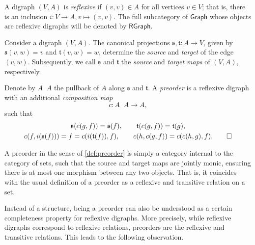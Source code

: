 \documentclass[12pt,dvipsnames,oneside]{amsart}
\theoremstyle{plain}
\theoremstyle{remark}
\theoremstyle{definition}
\newcommand*{\from}{\colon}
\newcommand{\plgraph}{\mathsf{Graph}}
\newcommand{\rgraph}{\mathsf{RGraph}}
\begin{document}
\begin{definition}\label{def:morphism-of-digraphs}
  A digraph \((V,A)\) is \emph{reflexive} if \((v,v)\in A\) for all vertices \(v\in V\);
  that is, there is an inclusion \(i\from V \to A, v \mapsto (v,v)\).
  The full subcategory of \(\plgraph\) whose objects are reflexive digraphs will be denoted by \(\rgraph\).
\end{definition}
Consider a digraph \((V,A)\).
The canonical projections \(\mathfrak{s}, \mathfrak{t} \from A \to V\), given by  \(\mathfrak{s} (v,w) = v\) and \(\mathfrak{t}(v,w) = w\), determine the \emph{source} and \emph{target} of the edge \((v,w)\).
Subsequently, we call \(\mathfrak{s}\) and \(\mathfrak{t}\) the \emph{source} and \emph{target maps} of \((V,A)\), respectively.









\begin{definition}\label{def:preorder}
  Denote by \(A \mathop{_{\mathfrak{s}}\times_{\mathfrak{t}}} A\) the pullback of \(A\) along \(\mathfrak{s}\) and \(\mathfrak{t}\).
  A \emph{preorder} is a reflexive digraph with an additional \emph{composition map}
  \[
    c \colon A \mathop{_{\mathfrak{s}}\times_{\mathfrak{t}}} A \to A,
  \]
  such that
  \begin{gather*}
    \mathfrak{s}(c(g,f)) = \mathfrak{s}(f), \qquad \mathfrak{t}(c(g,f)) = \mathfrak{t}(g), \\
    c(f,i(\mathfrak{s}(f))) = f = c(i(\mathfrak{t}(f)),f), \qquad c(h,c(g,f)) = c(c(h,g),f). \qedhere
  \end{gather*}
\end{definition}

\begin{remark}
  A preorder in the sense of \cref{def:preorder} is simply a category internal to the category of sets,
  such that the source and target maps are jointly monic, ensuring there is at most one morphism between any two objects.
  That is, it coincides with the usual definition of a preorder as a reflexive and transitive relation on a set.
\end{remark}

Instead of a structure, being a preorder can also be understood as a certain completeness property for reflexive digraphs.
More precisely, while reflexive digraphs correspond to reflexive relations, preorders are the reflexive and transitive relations.
This leads to the following observation.
\end{document}
